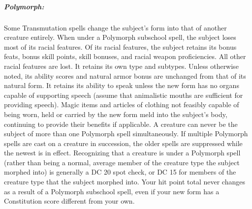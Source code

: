 
\subparagraph{Polymorph:}
Some Transmutation spells change the subject's form into that of another creature entirely.
When under a Polymorph subschool spell, the subject loses most of its racial features.
Of its racial features, the subject retains its bonus feats, bonus skill points, skill bonuses, and racial weapon proficiencies. All other racial features are lost.
It retains its own type and subtypes.
Unless otherwise noted, its ability scores and natural armor bonus are unchanged from that of its natural form. It retains its ability to speak unless the new form has no organs capable of supporting speech (assume that animalistic mouths are sufficient for providing speech).
Magic items and articles of clothing not feasibly capable of being worn, held or carried by the new form meld into the subject's body, continuing to provide their benefits if applicable.
A creature can never be the subject of more than one Polymorph spell simultaneously. If multiple Polymorph spells are cast on a creature in succession, the older spells are suppressed while the newest is in effect.
Recognizing that a creature is under a Polymorph spell (rather than being a normal, average member of the creature type the subject morphed into) is generally a DC 20 spot check, or DC
15 for members of the creature type that the subject morphed into.
Your hit point total never changes as a result of a Polymorph subschool spell, even if your new form has a Constitution score different from your own.
